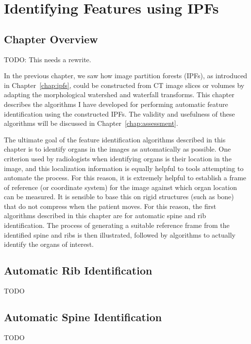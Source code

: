 \chapter{Identifying Features using IPFs}
\label{chap:featureid}

\section{Chapter Overview}

TODO: This needs a rewrite.

In the previous chapter, we saw how image partition forests (IPFs), as introduced in Chapter~\ref{chap:ipfs}, could be constructed from CT image slices or volumes by adapting the morphological watershed and waterfall transforms. This chapter describes the algorithms I have developed for performing automatic feature identification using the constructed IPFs. The validity and usefulness of these algorithms will be discussed in Chapter~\ref{chap:assessment}.

The ultimate goal of the feature identification algorithms described in this chapter is to identify organs in the images as automatically as possible. One criterion used by radiologists \cite{?} when identifying organs is their location in the image, and this localization information is equally helpful to tools attempting to automate the process. For this reason, it is extremely helpful to establish a frame of reference (or coordinate system) for the image against which organ location can be measured. It is sensible to base this on rigid structures (such as bone) that do not compress when the patient moves. For this reason, the first algorithms described in this chapter are for automatic spine and rib identification. The process of generating a suitable reference frame from the identified spine and ribs is then illustrated, followed by algorithms to actually identify the organs of interest.

\section{Automatic Rib Identification}

TODO

\section{Automatic Spine Identification}

TODO

